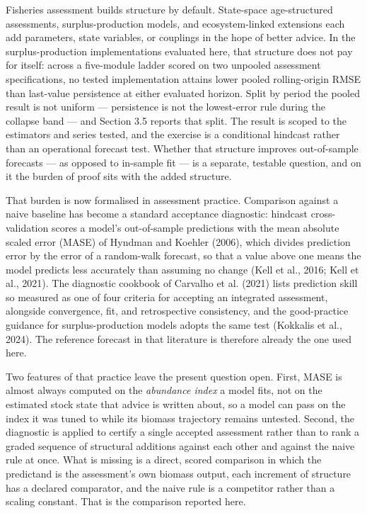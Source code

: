 \documentclass[11pt]{article}
\begin{document}
Fisheries assessment builds structure by default. State-space
age-structured assessments, surplus-production models, and
ecosystem-linked extensions each add parameters, state variables, or
couplings in the hope of better advice. In the surplus-production implementations evaluated here, that structure
does not pay for itself: across a five-module ladder scored on two
unpooled assessment specifications, no tested implementation attains
lower pooled rolling-origin RMSE than last-value persistence at either
evaluated horizon. Split by period the pooled result is not uniform ---
persistence is not the lowest-error rule during the collapse band ---
and Section 3.5 reports that split. The result is scoped to the estimators and
series tested, and the exercise is a conditional hindcast rather than
an operational forecast test. Whether that structure improves
out-of-sample forecasts --- as opposed to in-sample fit --- is a
separate, testable question, and on it the burden of proof sits with the
added structure.

That burden is now formalised in assessment practice. Comparison against
a naive baseline has become a standard acceptance diagnostic: hindcast
cross-validation scores a model's out-of-sample predictions with the
mean absolute scaled error (MASE) of Hyndman and Koehler (2006), which
divides prediction error by the error of a random-walk forecast, so that
a value above one means the model predicts less accurately than assuming
no change (Kell et al., 2016; Kell et al., 2021). The diagnostic
cookbook of Carvalho et al. (2021) lists prediction skill so measured as
one of four criteria for accepting an integrated assessment, alongside
convergence, fit, and retrospective consistency, and the good-practice
guidance for surplus-production models adopts the same test (Kokkalis
et al., 2024). The reference forecast in that literature is therefore
already the one used here.

Two features of that practice leave the present question open. First,
MASE is almost always computed on the \emph{abundance index} a model
fits, not on the estimated stock state that advice is written about, so
a model can pass on the index it was tuned to while its biomass
trajectory remains untested. Second, the diagnostic is applied to
certify a single accepted assessment rather than to rank a graded
sequence of structural additions against each other and against the
naive rule at once. What is missing is a direct, scored comparison in
which the predictand is the assessment's own biomass output, each
increment of structure has a declared comparator, and the naive rule is
a competitor rather than a scaling constant. That is the comparison
reported here.
\end{document}
